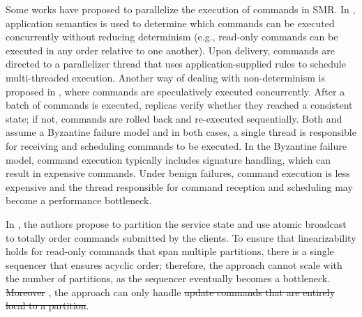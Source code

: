 \documentclass[10pt, conference, compsocconf, letterpaper]{IEEEtranv17}
\providecommand{\DIFadd}[1]{{\protect\color{blue}\uwave{#1}}} %
\providecommand{\DIFdel}[1]{{\protect\color{red}\sout{#1}}}                      %
\providecommand{\DIFaddbegin}{} %
\providecommand{\DIFaddend}{} %
\providecommand{\DIFdelbegin}{} %
\providecommand{\DIFdelend}{} %
\begin{document}
Some works have proposed to parallelize the execution of commands in SMR. 
In \cite{kotla2004htbft}, application semantics is used to determine which commands can be executed concurrently without reducing determinism (e.g., read-only commands can be executed in any order relative to one another). 
Upon delivery, commands are directed to a parallelizer thread that uses application-supplied rules to schedule multi-threaded execution. 
Another way of dealing with non-determinism is proposed in \cite{kapritzos2012eve}, where commands are speculatively executed concurrently.
After a batch of commands is executed, replicas verify whether they reached a consistent state; if not, commands are rolled back and re-executed sequentially. 
Both \cite{kotla2004htbft} and \cite{kapritzos2012eve} assume a Byzantine failure model and in both cases, a single thread is responsible for receiving and scheduling commands to be executed. 
In the Byzantine failure model, command execution typically includes signature handling, which can result in expensive commands.
Under benign failures, command execution is less expensive and the thread responsible for command reception and scheduling may become a performance bottleneck.

In \cite{Marandi11}, the authors propose to partition the service state and use atomic broadcast to totally order commands submitted by the clients. 
To ensure that linearizability holds for read-only commands that span multiple partitions, there is a single sequencer that ensures acyclic order; therefore, the approach cannot scale with the number of partitions, as the sequencer eventually becomes a bottleneck.
\DIFdelbegin \DIFdel{Moreover}\DIFdelend %
\DIFaddbegin \DIFadd{Also}\DIFaddend , the approach can only handle \DIFdelbegin \DIFdel{update commands that are entirely local to a partition}\DIFdelend \DIFaddbegin \DIFadd{single-partition update commands}\DIFaddend .

\end{document}
